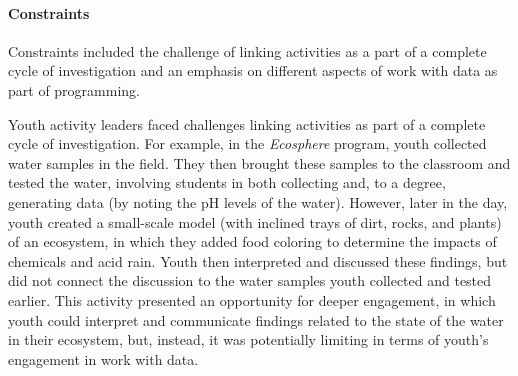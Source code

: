 \documentclass[]{book}
\let\oldparagraph\paragraph
\renewcommand{\paragraph}[1]{\oldparagraph{#1}\mbox{}}
\theoremstyle{definition}
\theoremstyle{definition}
\theoremstyle{definition}
\theoremstyle{remark}
\begin{document}
\paragraph{Constraints}\label{constraints}

Constraints included the challenge of linking activities as a part of a
complete cycle of investigation and an emphasis on different aspects of
work with data as part of programming.

Youth activity leaders faced challenges linking activities as part of a
complete cycle of investigation. For example, in the \emph{Ecosphere}
program, youth collected water samples in the field. They then brought
these samples to the classroom and tested the water, involving students
in both collecting and, to a degree, generating data (by noting the pH
levels of the water). However, later in the day, youth created a
small-scale model (with inclined trays of dirt, rocks, and plants) of an
ecosystem, in which they added food coloring to determine the impacts of
chemicals and acid rain. Youth then interpreted and discussed these
findings, but did not connect the discussion to the water samples youth
collected and tested earlier. This activity presented an opportunity for
deeper engagement, in which youth could interpret and communicate
findings related to the state of the water in their ecosystem, but,
instead, it was potentially limiting in terms of youth's engagement in
work with data.
\end{document}
